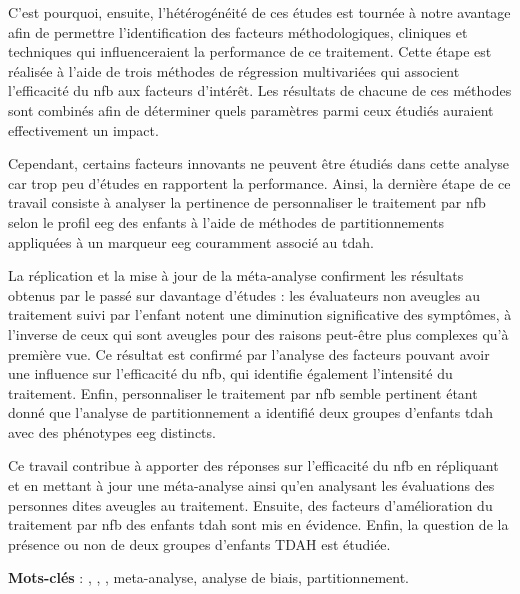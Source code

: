 C'est pourquoi, ensuite, l'hétérogénéité de ces études est tournée à notre avantage afin de permettre l'identification 
des facteurs méthodologiques, cliniques et techniques qui influenceraient la performance de ce traitement. Cette étape 
est réalisée à l'aide de trois méthodes de régression multivariées qui associent l'efficacité du \gls{nfb} aux facteurs d'intérêt. 
Les résultats de chacune de ces méthodes sont combinés afin de déterminer quels paramètres parmi ceux étudiés auraient effectivement un impact. 

Cependant, certains facteurs innovants ne peuvent être étudiés dans cette analyse car trop peu d'études en rapportent la performance. 
Ainsi, la dernière étape de ce travail consiste à analyser la pertinence de personnaliser le traitement par \gls{nfb} selon le profil 
\gls{eeg} des enfants à l'aide de méthodes de partitionnements appliquées à un marqueur \gls{eeg} couramment associé au \gls{tdah}. 

La réplication et la mise à jour de la méta-analyse confirment les résultats obtenus par le passé sur davantage d'études : 
les évaluateurs non aveugles au traitement suivi par l'enfant notent une diminution significative des symptômes, à l'inverse 
de ceux qui sont aveugles pour des raisons peut-être plus complexes qu'à première vue. Ce résultat est confirmé par l'analyse 
des facteurs pouvant avoir une influence sur l'efficacité du \gls{nfb}, qui identifie également l'intensité du traitement. Enfin, 
personnaliser le traitement par \gls{nfb} semble pertinent étant donné que l'analyse de partitionnement a identifié deux groupes d'enfants \gls{tdah} avec des phénotypes \gls{eeg} distincts.

Ce travail contribue à apporter des réponses sur l'efficacité du \gls{nfb} en répliquant et en mettant à jour une méta-analyse ainsi qu'en analysant 
les évaluations des personnes dites aveugles au traitement. Ensuite, des facteurs d'amélioration du traitement par \gls{nfb} des enfants \gls{tdah} sont mis 
en évidence. Enfin, la question de la présence ou non de deux groupes d'enfants TDAH est étudiée.




\large{\textbf{Mots-clés}} : , , , meta-analyse, analyse de biais, partitionnement.